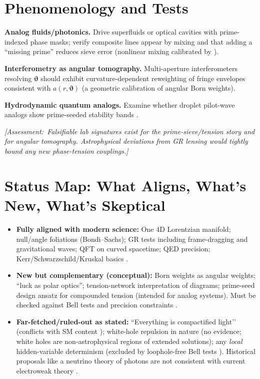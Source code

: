 \documentclass[reprint,amsmath,amssymb,aps]{revtex4-2}
\newcommand{\angb}{\boldsymbol{\vartheta}}     %
\newcommand{\Assessment}[1]{\par\smallskip\noindent\textit{\color{blue}[Assessment:\ #1]}\par\smallskip}
\begin{document}
\section{Phenomenology and Tests}
\textbf{Analog fluids/photonics.} Drive superfluids or optical cavities with prime-indexed phase masks; verify composite lines appear by mixing and that adding a ``missing prime'' reduces sieve error (nonlinear mixing calibrated by \cite{BoydNLO}). 

\textbf{Interferometry as angular tomography.} Multi-aperture interferometers resolving $\angb$ should exhibit curvature-dependent reweighting of fringe envelopes consistent with $a(r,\angb)$ (a geometric calibration of angular Born weights).

\textbf{Hydrodynamic quantum analogs.} Examine whether droplet pilot-wave analogs show prime-seeded stability bands \cite{CouderFort2006,Bush2015}.

\Assessment{Falsifiable lab signatures exist for the prime-sieve/tension story and for angular tomography. Astrophysical deviations from GR lensing would tightly bound any new phase-tension couplings.}

\section{Status Map: What Aligns, What’s New, What’s Skeptical}
\begin{itemize}
\item \textbf{Fully aligned with modern science:} One 4D Lorentzian manifold; null/angle foliations (Bondi–Sachs); GR tests including frame-dragging and gravitational waves; QFT on curved spacetime; QED precision; Kerr/Schwarzschild/Kruskal basics \cite{Will2014,LIGO2016,GPB2011,BirrellDavies,ParkerToms,Kerr1963,Kraniotis2005,Kruskal1960,PDG2024}.
\item \textbf{New but complementary (conceptual):} Born weights as angular weights; “luck as polar optics”; tension-network interpretation of diagrams; prime-seed design ansatz for compounded tension (intended for analog systems). Must be checked against Bell tests and precision constraints \cite{Hensen2015,Giustina2015,Shalm2015,Bohm1952}.
\item \textbf{Far-fetched/ruled-out as stated:} ``Everything is compactified light’’ (conflicts with SM content \cite{PDG2024}); white-hole repulsion in nature (no evidence; white holes are non-astrophysical regions of extended solutions); any \emph{local} hidden-variable determinism (excluded by loophole-free Bell tests \cite{Hensen2015,Giustina2015,Shalm2015}). Historical proposals like a neutrino theory of photons are not consistent with current electroweak theory \cite{Perkins1965,PDG2024}.
\end{itemize}
\end{document}
